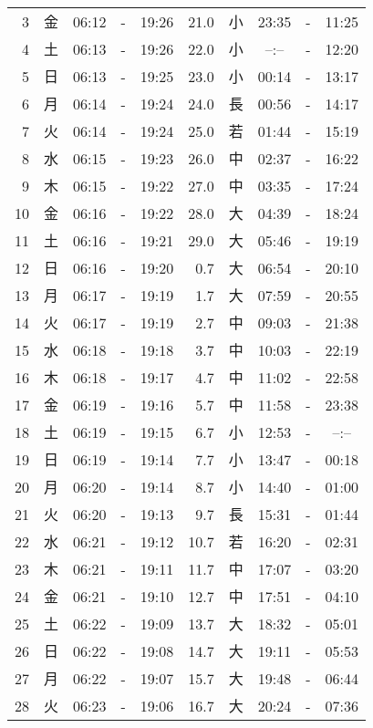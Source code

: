 \documentclass[a4j,10pt]{jsarticle}
\begin{document}
\begin{center}
\begin{table}[ht]
\begin{center}
\begin{tabular}{|rc|ccc|rc|ccc|}
  3 & 金 & 06:12 &-& 19:26 & 21.0 & 小 & 23:35 &-& 11:25 \\
  4 & 土 & 06:13 &-& 19:26 & 22.0 & 小 & --:-- &-& 12:20 \\
  5 & 日 & 06:13 &-& 19:25 & 23.0 & 小 & 00:14 &-& 13:17 \\
  6 & 月 & 06:14 &-& 19:24 & 24.0 & 長 & 00:56 &-& 14:17 \\
  7 & 火 & 06:14 &-& 19:24 & 25.0 & 若 & 01:44 &-& 15:19 \\
  8 & 水 & 06:15 &-& 19:23 & 26.0 & 中 & 02:37 &-& 16:22 \\
  9 & 木 & 06:15 &-& 19:22 & 27.0 & 中 & 03:35 &-& 17:24 \\
 10 & 金 & 06:16 &-& 19:22 & 28.0 & 大 & 04:39 &-& 18:24 \\
 11 & 土 & 06:16 &-& 19:21 & 29.0 & 大 & 05:46 &-& 19:19 \\
 12 & 日 & 06:16 &-& 19:20 &  0.7 & 大 & 06:54 &-& 20:10 \\
 13 & 月 & 06:17 &-& 19:19 &  1.7 & 大 & 07:59 &-& 20:55 \\
 14 & 火 & 06:17 &-& 19:19 &  2.7 & 中 & 09:03 &-& 21:38 \\
 15 & 水 & 06:18 &-& 19:18 &  3.7 & 中 & 10:03 &-& 22:19 \\
 16 & 木 & 06:18 &-& 19:17 &  4.7 & 中 & 11:02 &-& 22:58 \\
 17 & 金 & 06:19 &-& 19:16 &  5.7 & 中 & 11:58 &-& 23:38 \\
 18 & 土 & 06:19 &-& 19:15 &  6.7 & 小 & 12:53 &-& --:-- \\
 19 & 日 & 06:19 &-& 19:14 &  7.7 & 小 & 13:47 &-& 00:18 \\
 20 & 月 & 06:20 &-& 19:14 &  8.7 & 小 & 14:40 &-& 01:00 \\
 21 & 火 & 06:20 &-& 19:13 &  9.7 & 長 & 15:31 &-& 01:44 \\
 22 & 水 & 06:21 &-& 19:12 & 10.7 & 若 & 16:20 &-& 02:31 \\
 23 & 木 & 06:21 &-& 19:11 & 11.7 & 中 & 17:07 &-& 03:20 \\
 24 & 金 & 06:21 &-& 19:10 & 12.7 & 中 & 17:51 &-& 04:10 \\
 25 & 土 & 06:22 &-& 19:09 & 13.7 & 大 & 18:32 &-& 05:01 \\
 26 & 日 & 06:22 &-& 19:08 & 14.7 & 大 & 19:11 &-& 05:53 \\
 27 & 月 & 06:22 &-& 19:07 & 15.7 & 大 & 19:48 &-& 06:44 \\
 28 & 火 & 06:23 &-& 19:06 & 16.7 & 大 & 20:24 &-& 07:36 \\

\end{tabular}
\end{center}
\end{table}
\end{center}
\end{document}
